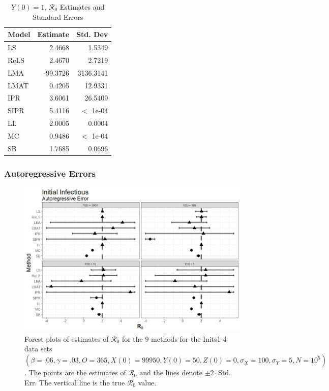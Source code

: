 \documentclass[12pt]{article}
\newcommand{\xxsir}{\ensuremath{9} } %
\newcommand{\rr}{\ensuremath{\mathcal{R}_0}}
\begin{document}
\begin{table}[H]
	
	\centering
	\begin{tabular}[t]{l|r|r}
		\hline
		Model & Estimate & Std. Dev\\
		\hline
		LS & 2.4668 & 1.5349\\
		\hline
		ReLS & 2.4670 & 2.7219\\
		\hline
		LMA & -99.3726 & 3136.3141\\
		\hline
		LMAT & 0.4205 & 12.9331\\
		\hline
		IPR & 3.6061 & 26.5409\\
		\hline
		SIPR & 5.4116 & $<$ 1e-04\\
		\hline
		LL & 2.0005 & 0.0004\\
		\hline
		MC & 0.9486 & $<$ 1e-04\\
		\hline
		SB & 1.7685 & 0.0696\\
		\hline
	\end{tabular}
	\caption{$Y(0) = 1$, $\rr$ Estimates and Standard Errors}
\end{table}


\subsubsection{Autoregressive Errors}

\begin{figure}[H]
	\centering
	\includegraphics[scale=0.5]{images/start_ar.jpeg}
	\caption{Forest plots of estimates of $\rr$ for the \xxsir methods for the Inits1-4 data sets $(\beta=.06, \gamma=.03, O=365, X(0)=99950, Y(0)=50, Z(0)=0, \sigma_X=100, \sigma_Y=5, N=10^5)$.  The points are the estimates of $\rr$ and the lines denote $\pm 2\cdot $Std. Err.  The vertical line is the true $\rr$ value.}
\end{figure}
\end{document}
